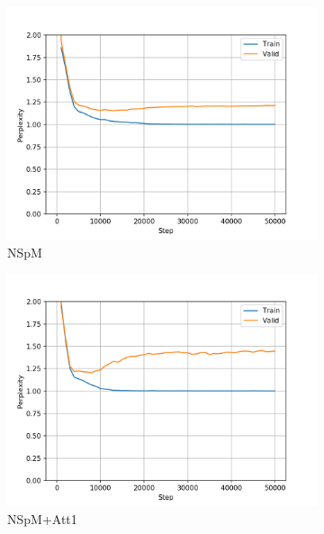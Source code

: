 \begin{figure}[H]
\centering
\begin{subfigure}{0.45\textwidth}
\includegraphics[width=\textwidth]{../results/monument2_1/run1/neural_sparql_machine/ppls.png} 
\caption{NSpM}
\label{fig:monu1 nsm ppl}
\end{subfigure}
\hfill
\begin{subfigure}{0.45\textwidth}
\includegraphics[width=\textwidth]{../results/monument2_1/run1/neural_sparql_machine_bahdanau_attention/ppls.png}
\caption{NSpM+Att1}
\label{fig:monu1 nsm-bah ppl}
\end{subfigure}
\hfill
\begin{subfigure}{0.45\textwidth}

\end{subfigure}
\end{figure}
